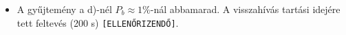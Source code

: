 \begin{center}\end{center}
\begin{eredmeny}

\begin{center}\end{center}
\end{eredmeny}
\begin{tipp}[Ellenőrzés]
\begin{itemize}
\item A gyűjtemény a d)-nél $P_b\approx1\%$-nál abbamarad. A visszahívás tartási idejére tett feltevés (200 s) \texttt{[ELLENŐRIZENDŐ]}.
\end{itemize}
\end{tipp}



